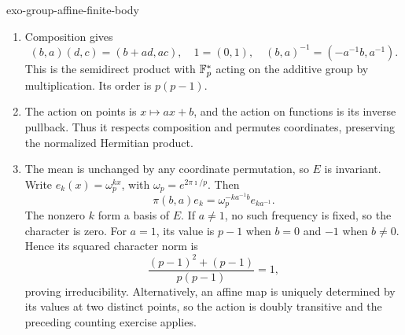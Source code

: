 \begin{correction}{exo-group-affine-finite-body}
\begin{enumerate}
\item Composition gives
\[
 (b,a)(d,c)=(b+ad,ac),\quad 1=(0,1),\quad
 (b,a)^{-1}=(-a^{-1}b,a^{-1}).
\]
This is the semidirect product with $\mathbb{F}_p^*$ acting on the additive
group by multiplication. Its order is $p(p-1)$.
\item The action on points is $x\mapsto ax+b$, and the action on
functions is its inverse pullback. Thus it respects composition and
permutes coordinates, preserving the normalized Hermitian product.
\item The mean is unchanged by any coordinate permutation, so $E$ is
invariant. Write $e_k(x)=\omega_p^{kx}$, with
$\omega_p=e^{2\pi\imath/p}$. Then
\[
 \pi(b,a)e_k=\omega_p^{-ka^{-1}b}e_{ka^{-1}}.
\]
The nonzero $k$ form a basis of $E$. If $a\ne1$, no such frequency is
fixed, so the character is zero. For $a=1$, its value is $p-1$ when
$b=0$ and $-1$ when $b\ne0$. Hence its squared character norm is
\[
 \frac{(p-1)^2+(p-1)}{p(p-1)}=1,
\]
proving irreducibility. Alternatively, an affine map is uniquely determined
by its values at two distinct points, so the action is doubly transitive
and the preceding counting exercise applies.
\end{enumerate}
\end{correction}

